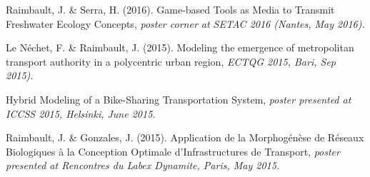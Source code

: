 \bigskip

\noindent Raimbault, J. \& Serra, H. (2016). Game-based Tools as Media to Transmit Freshwater Ecology Concepts, \textit{poster corner at SETAC 2016 (Nantes, May 2016).}


\bigskip

\noindent Le Néchet, F. \& Raimbault, J. (2015). Modeling the emergence of metropolitan transport authority in a polycentric urban region, \textit{ECTQG 2015, Bari, Sep 2015).}


\bigskip

\noindent Hybrid Modeling of a Bike-Sharing Transportation System, \textit{poster presented at ICCSS 2015, Helsinki, June 2015.}

\bigskip

\noindent Raimbault, J. \& Gonzales, J. (2015). Application de la Morphog{\'e}n{\`e}se de R{\'e}seaux Biologiques {\`a} la Conception Optimale d'Infrastructures de Transport, \textit{poster presented at Rencontres du Labex Dynamite, Paris, May 2015.}


